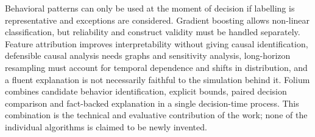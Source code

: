 Behavioral patterns can only be used at the moment of decision if labelling is representative and exceptions are considered. Gradient boosting allows non-linear classification, but reliability and construct validity must be handled separately. Feature attribution improves interpretability without giving causal identification, defensible causal analysis needs graphs and sensitivity analysis, long-horizon resampling must account for temporal dependence and shifts in distribution, and a fluent explanation is not necessarily faithful to the simulation behind it. Folium combines candidate behavior identification, explicit bounds, paired decision comparison and fact-backed explanation in a single decision-time process. This combination is the technical and evaluative contribution of the work; none of the individual algorithms is claimed to be newly invented.

